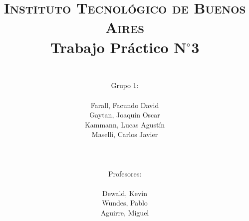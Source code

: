 




	\title{
		\normalfont \normalsize \textsc{Instituto Tecnol\'ogico de Buenos Aires} \\ [25pt]
		\huge Trabajo Pr\'actico N$^{\circ}$3 \\
		\author{
			\\Grupo 1:\\\\Farall, Facundo David\\Gaytan, Joaqu\'in Oscar\\Kammann, Lucas Agust\'in\\Maselli, Carlos Javier\\ \\ \\ \\
			Profesores: \\\\ Dewald, Kevin\\Wundes, Pablo\\Aguirre, Miguel \\ \\ 
		}	
	}
	\maketitle
	\newpage

	\tableofcontents

	\newpage
	
	\newpage
	
	\newpage
	

